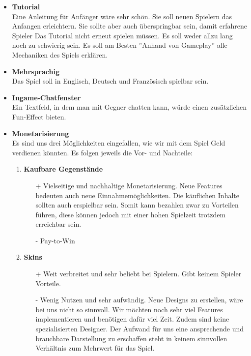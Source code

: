 \begin{itemize}
    \item \textbf{Tutorial} \\
        Eine Anleitung für Anfänger wäre sehr schön. Sie soll neuen Spielern das Anfangen erleichtern. Sie sollte aber auch überspringbar sein,
        damit erfahrene Spieler Das Tutorial nicht erneut spielen müssen. Es soll weder allzu lang noch zu schwierig sein. Es soll am Besten ''Anhand von Gameplay'' alle Mechaniken des Spiels
        erklären.
    \item \textbf{Mehrsprachig} \\
        Das Spiel soll in Englisch, Deutsch und Französisch spielbar sein.
    \item \textbf{Ingame-Chatfenster}\\
        Ein Textfeld, in dem man mit Gegner chatten kann, würde einen zusätzlichen Fun-Effect bieten.
    \item \textbf{Monetarisierung} \\
    Es sind uns drei Möglichkeiten eingefallen, wie wir mit dem Spiel Geld verdienen könnten. Es folgen jeweils die Vor- und Nachteile:
    \begin{enumerate}
        \item \textbf{Kaufbare Gegenstände}
        \begin{itemize}
            \item[+] Vielseitige und nachhaltige Monetarisierung. Neue Features bedeuten auch neue Einnahmemöglichkeiten. Die käuflichen Inhalte sollten
                        auch erspielbar sein. Somit kann bezahlen zwar zu Vorteilen führen, diese können jedoch mit einer hohen Spielzeit trotzdem erreichbar sein.
            \item[-] Pay-to-Win
        \end{itemize}
        \item \textbf{Skins}
        \begin{itemize}
            \item[+] Weit verbreitet und sehr beliebt bei Spielern. Gibt keinem Spieler Vorteile.
            \item[-] Wenig Nutzen und sehr aufwändig. Neue Designs zu erstellen, wäre bei uns nicht so sinnvoll.
                        Wir möchten noch sehr viel Features implementieren und benötigen dafür viel Zeit. Zudem sind keine spezialisierten Designer. Der Aufwand für uns eine ansprechende und brauchbare Darstellung zu erschaffen steht in keinem sinnvollen Verhältnis zum Mehrwert für das Spiel.
        \end{itemize}

\end{enumerate}
\end{itemize}
